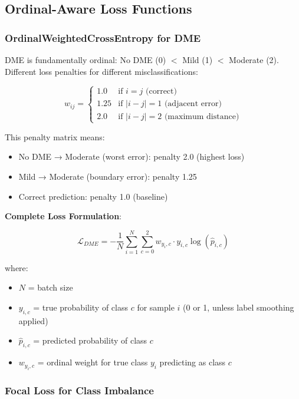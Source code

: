 \subsection{Ordinal-Aware Loss Functions}

\subsubsection{OrdinalWeightedCrossEntropy for DME}

DME is fundamentally ordinal: No DME (0) $<$ Mild (1) $<$ Moderate (2). Different loss penalties for different misclassifications:

\begin{equation}
w_{ij} = \begin{cases}
1.0 & \text{if } i = j \text{ (correct)} \\
1.25 & \text{if } |i - j| = 1 \text{ (adjacent error)} \\
2.0 & \text{if } |i - j| = 2 \text{ (maximum distance)}
\end{cases}
\end{equation}

This penalty matrix means:
\begin{itemize}
    \item No DME → Moderate (worst error): penalty 2.0 (highest loss)
    \item Mild → Moderate (boundary error): penalty 1.25
    \item Correct prediction: penalty 1.0 (baseline)
\end{itemize}

\textbf{Complete Loss Formulation}:

\begin{equation}
\mathcal{L}_{DME} = -\frac{1}{N} \sum_{i=1}^{N} \sum_{c=0}^{2} w_{y_i,c} \cdot y_{i,c} \log(\hat{p}_{i,c})
\end{equation}

where:
\begin{itemize}
    \item $N$ = batch size
    \item $y_{i,c}$ = true probability of class $c$ for sample $i$ (0 or 1, unless label smoothing applied)
    \item $\hat{p}_{i,c}$ = predicted probability of class $c$
    \item $w_{y_i,c}$ = ordinal weight for true class $y_i$ predicting as class $c$
\end{itemize}

\subsubsection{Focal Loss for Class Imbalance}

